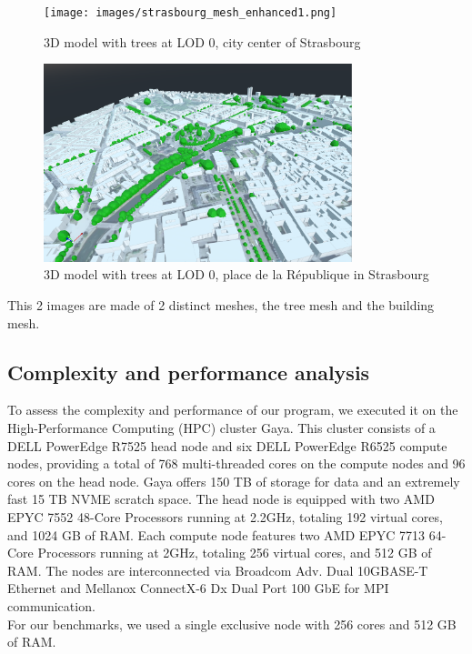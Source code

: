 \documentclass[12pt]{article}
\begin{document}
\begin{figure}[H]
    \centering
    \texttt{[image: images/strasbourg\_mesh\_enhanced1.png]}
    \caption{3D model with trees at LOD 0, city center of Strasbourg}
\end{figure}

\begin{figure}[H]
    \centering
    \includegraphics[width=0.8\textwidth]{images/strasbourg_mesh_enhanced2.png}
    \caption{3D model with trees at LOD 0, place de la République in Strasbourg}
\end{figure}

This 2 images are made of 2 distinct meshes, the tree mesh and the building mesh.

\subsection{Complexity and performance analysis}

To assess the complexity and performance of our program, we executed it on
the High-Performance Computing (HPC) cluster Gaya. This cluster consists of a
DELL PowerEdge R7525 head node and six DELL PowerEdge R6525 compute nodes,
providing a total of 768 multi-threaded cores on the compute nodes and 96 cores
on the head node. Gaya offers 150 TB of storage for data and an extremely fast
15 TB NVME scratch space. The head node is equipped with two AMD EPYC 7552
48-Core Processors running at 2.2GHz, totaling 192 virtual cores, and 1024
GB of RAM. Each compute node features two AMD EPYC 7713 64-Core Processors
running at 2GHz, totaling 256 virtual cores, and 512 GB of RAM.
The nodes are interconnected via Broadcom Adv. Dual 10GBASE-T Ethernet and
Mellanox ConnectX-6 Dx Dual Port 100 GbE for MPI communication.\\
For our benchmarks, we used a single exclusive node with 256 cores and 512 GB
of RAM.
\end{document}
